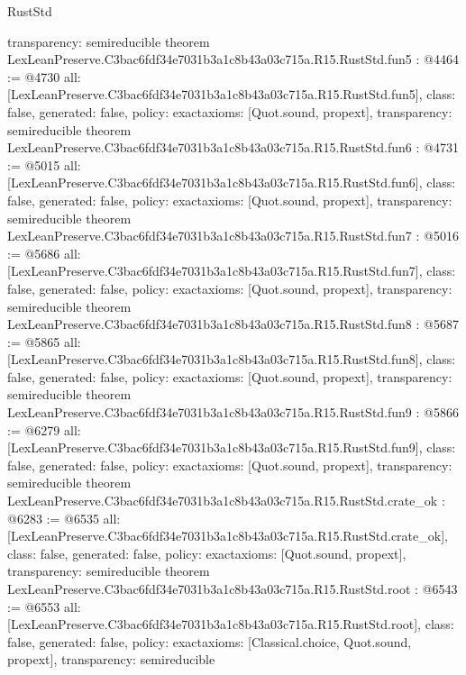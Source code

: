 \begin{lexlean}{RustStd}
\begin{coremodule}
{  transparency: semireducible
}
theorem LexLeanPreserve.C3bac6fdf34e7031b3a1c8b43a03c715a.R15.RustStd.fun5 : @4464 := @4730 {
  all: [LexLeanPreserve.C3bac6fdf34e7031b3a1c8b43a03c715a.R15.RustStd.fun5],
  class: false,
  generated: false,
  policy: exact{axioms: [Quot.sound, propext]},
  transparency: semireducible
}
theorem LexLeanPreserve.C3bac6fdf34e7031b3a1c8b43a03c715a.R15.RustStd.fun6 : @4731 := @5015 {
  all: [LexLeanPreserve.C3bac6fdf34e7031b3a1c8b43a03c715a.R15.RustStd.fun6],
  class: false,
  generated: false,
  policy: exact{axioms: [Quot.sound, propext]},
  transparency: semireducible
}
theorem LexLeanPreserve.C3bac6fdf34e7031b3a1c8b43a03c715a.R15.RustStd.fun7 : @5016 := @5686 {
  all: [LexLeanPreserve.C3bac6fdf34e7031b3a1c8b43a03c715a.R15.RustStd.fun7],
  class: false,
  generated: false,
  policy: exact{axioms: [Quot.sound, propext]},
  transparency: semireducible
}
theorem LexLeanPreserve.C3bac6fdf34e7031b3a1c8b43a03c715a.R15.RustStd.fun8 : @5687 := @5865 {
  all: [LexLeanPreserve.C3bac6fdf34e7031b3a1c8b43a03c715a.R15.RustStd.fun8],
  class: false,
  generated: false,
  policy: exact{axioms: [Quot.sound, propext]},
  transparency: semireducible
}
theorem LexLeanPreserve.C3bac6fdf34e7031b3a1c8b43a03c715a.R15.RustStd.fun9 : @5866 := @6279 {
  all: [LexLeanPreserve.C3bac6fdf34e7031b3a1c8b43a03c715a.R15.RustStd.fun9],
  class: false,
  generated: false,
  policy: exact{axioms: [Quot.sound, propext]},
  transparency: semireducible
}
theorem LexLeanPreserve.C3bac6fdf34e7031b3a1c8b43a03c715a.R15.RustStd.crate_ok : @6283 := @6535 {
  all: [LexLeanPreserve.C3bac6fdf34e7031b3a1c8b43a03c715a.R15.RustStd.crate_ok],
  class: false,
  generated: false,
  policy: exact{axioms: [Quot.sound, propext]},
  transparency: semireducible
}
theorem LexLeanPreserve.C3bac6fdf34e7031b3a1c8b43a03c715a.R15.RustStd.root : @6543 := @6553 {
  all: [LexLeanPreserve.C3bac6fdf34e7031b3a1c8b43a03c715a.R15.RustStd.root],
  class: false,
  generated: false,
  policy: exact{axioms: [Classical.choice, Quot.sound, propext]},
  transparency: semireducible
}


\end{coremodule}
\end{lexlean}
